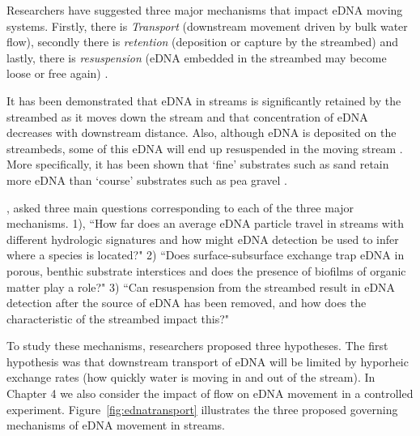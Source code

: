 \vspace{5mm}


Researchers have suggested three major mechanisms that impact eDNA  moving systems. Firstly, there is \textit{Transport} (downstream movement driven by bulk water flow),
secondly there is \textit{retention} (deposition or capture by the streambed) and lastly, there is \textit{resuspension} (eDNA embedded in the streambed may become loose or free again) \citep{ednatransport}.

\vspace{5mm}

It has been demonstrated that eDNA in streams is significantly retained by the streambed as it moves down the stream and that concentration of eDNA decreases with downstream distance. Also, although eDNA is deposited on the streambeds, some of this eDNA will end up resuspended in the moving stream \citep{substrate}. More specifically, it has been shown that `fine' substrates such as sand retain more eDNA than `course' substrates such as pea gravel \citep{porous}.



\vspace{5mm}

 \citep{ednatransport}, asked three main questions corresponding to each of the three major mechanisms. 
1), ``How far does an average eDNA particle travel in streams with different hydrologic signatures and how might eDNA detection be used to infer where a species is located?"
2) ``Does surface-subsurface exchange trap eDNA in porous, benthic substrate interstices and does the presence of biofilms of organic matter play a role?"
3) ``Can resuspension from the streambed result in eDNA detection after the source of eDNA has been removed, and how does the characteristic of the streambed impact this?"

\vspace{5mm}


To study these mechanisms, researchers proposed three hypotheses. The first hypothesis was that  downstream transport of eDNA will be limited by hyporheic exchange rates (how quickly water is moving in and out of the stream). In Chapter 4 we  also consider the impact of flow on eDNA movement in a controlled experiment. Figure~\ref{fig:ednatransport} illustrates the three proposed governing mechanisms of eDNA movement in streams.



